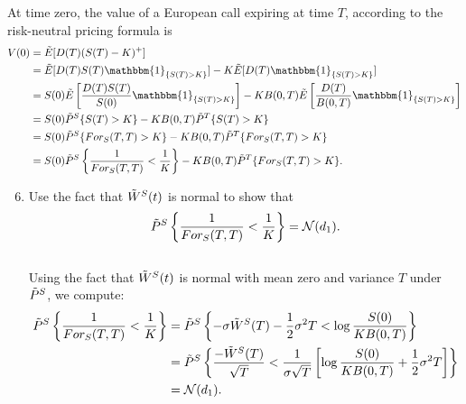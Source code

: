 \documentclass[11pt,a4,table]{article}
\begin{document}
\begin{enumerate}
    At time zero, the value of a European call expiring at time $T$, according to the risk-neutral pricing formula is
    \begin{align}
        V(0) &= \Tilde{E}[D(T)(S(T)-K)^+] \nonumber \\
        &= \Tilde{E}[D(T)S(T)\mathbbm{1}_{\{S(T)>K\}}] - K\Tilde{E}[D(T)\mathbbm{1}_{\{S(T)>K\}}] \nonumber \\
        &= S(0)\Tilde{E}\left[\frac{D(T)S(T)}{S(0)}\mathbbm{1}_{\{S(T)>K\}}\right] - KB(0,T)\Tilde{E}\left[\frac{D(T)}{B(0,T)}\mathbbm{1}_{\{S(T)>K\}}\right] \nonumber \\
        &= S(0)\Tilde{P}^S\{S(T)>K\} - KB(0,T)\Tilde{P}^T\{S(T)>K\} \nonumber \\
        &= S(0)\Tilde{P}^S\{For_S(T,T)>K\} - KB(0,T)\Tilde{P}^T\{For_S(T,T)>K\} \nonumber \\
        &= S(0)\Tilde{P}^S\left\{\frac{1}{For_S(T,T)}<\frac{1}{K}\right\} - KB(0,T)\Tilde{P}^T\{For_S(T,T)>K\}.
    \end{align}
    \begin{enumerate}
        \setcounter{enumii}{5}
        
        \item Use the fact that $\Tilde{W}^S(t)$ is normal to show that
        \begin{equation*}
            \Tilde{P}^S\left\{\frac{1}{For_S(T,T)} < \frac{1}{K}\right\} = \mathcal{N}(d_1).
        \end{equation*}\\
        Using the fact that $\Tilde{W}^S(t)$ is normal with mean zero and variance $T$ under $\Tilde{P}^S$, we compute:
        \begin{align*}
            \Tilde{P}^S\left\{\frac{1}{For_S(T,T)}<\frac{1}{K}\right\} &= \Tilde{P}^S \left\{-\sigma\Tilde{W}^S(T) - \frac{1}{2}\sigma^2T < \log\frac{S(0)}{KB(0,T)}\right\} \\
            &= \Tilde{P}^S\left\{\frac{-\Tilde{W}^S(T)}{\sqrt{T}} < \frac{1}{\sigma\sqrt{T}}\left[\log\frac{S(0)}{KB(0,T)} + \frac{1}{2}\sigma^2 T\right]\right\} \\
            &= \mathcal{N}(d_1).
        \end{align*}
        

\end{enumerate}
\end{enumerate}
\end{document}
